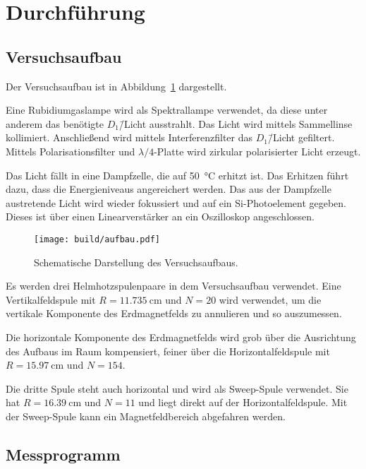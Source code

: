 \section{Durchführung}%
\label{sec:durchfuehrung}

\subsection{Versuchsaufbau}%
\label{sub:versuchsaufbau}

Der Versuchsaufbau ist in Abbildung~\ref{fig:aufbau} dargestellt.

Eine Rubidiumgaslampe wird als Spektrallampe verwendet, da diese
unter anderem das benötigte $D_1$\=/Licht ausstrahlt.
Das Licht wird mittels Sammellinse kollimiert.
Anschließend wird mittels Interferenzfilter das $D_1$\=/Licht gefiltert.
Mittels Polarisationsfilter und $\lambda/4$-Platte wird zirkular polarisierter
Licht erzeugt.

Das Licht fällt in eine Dampfzelle, die auf \SI{50}{\celsius} erhitzt ist.
Das Erhitzen führt dazu, dass die Energieniveaus angereichert werden.
Das aus der Dampfzelle austretende Licht wird wieder fokussiert und auf ein
Si-Photoelement gegeben.
Dieses ist über einen Linearverstärker an ein Oszilloskop angeschlossen.

\begin{figure}[ht]
  \centering
  \texttt{[image: build/aufbau.pdf]}
  \caption{Schematische Darstellung des Versuchsaufbaus.~\cite{anleitung}}%
  \label{fig:aufbau}
\end{figure}

Es werden drei Helmhotzspulenpaare in dem Versuchsaufbau verwendet.
Eine Vertikalfeldspule mit
$R = \SI{11.735}{\centi\meter}$ und $N = \num{20}$
wird verwendet, um die vertikale Komponente des Erdmagnetfelds zu annulieren
und so auszumessen.

Die horizontale Komponente des Erdmagnetfelds wird grob über die Ausrichtung
des Aufbaus im Raum kompensiert,
feiner über die Horizontalfeldspule mit
$R = \SI{15.97}{\centi\meter}$ und $N = \num{154}$.

Die dritte Spule steht auch horizontal und wird als Sweep-Spule verwendet.
Sie hat
$R = \SI{16.39}{\centi\meter}$ und $N = \num{11}$
und liegt direkt auf der Horizontalfeldspule.
Mit der Sweep-Spule kann ein Magnetfeldbereich abgefahren werden.


\subsection{Messprogramm}%
\label{sub:messprogramm}

